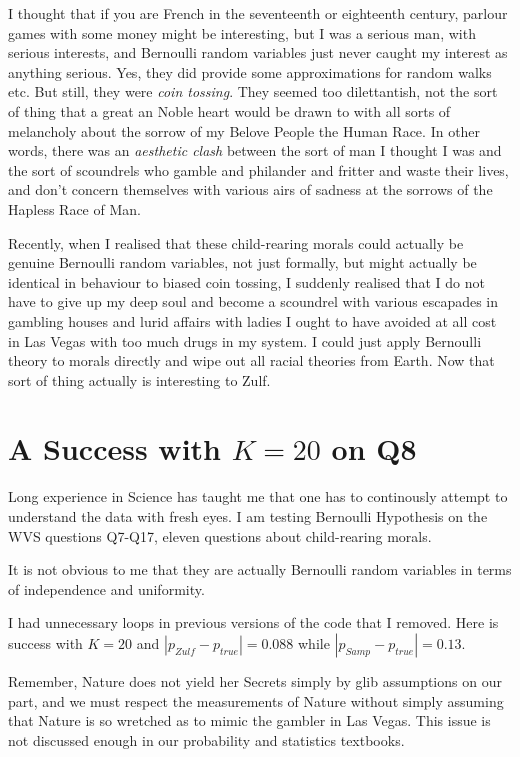 \documentclass{amsart}
\begin{document}
I thought that if you are French in the seventeenth or eighteenth century, parlour games with some money might be interesting, but I was a serious man, with serious interests, and Bernoulli random variables just never caught my interest as anything serious.  Yes, they did provide some approximations for random walks etc. But still, they were {\em coin tossing}.  They seemed too dilettantish, not the sort of thing that a great an Noble heart would be drawn to with all sorts of melancholy about the sorrow of my Belove People the Human Race.  In other words, there was an {\em aesthetic clash} between the sort of man I thought I was and the sort of scoundrels who gamble and philander and fritter and waste their lives, and don't concern themselves with various airs of sadness at the sorrows of the Hapless Race of Man.  

Recently, when I realised that these child-rearing morals could actually be genuine Bernoulli random variables, not just formally, but might actually be identical in behaviour to biased coin tossing, I suddenly realised that I do not have to give up my deep soul and become a scoundrel with various escapades in gambling houses and lurid affairs with ladies I ought to have avoided at all cost in Las Vegas with too much drugs in my system.  I could just apply Bernoulli theory to morals directly and wipe out all racial theories from Earth.  Now that sort of thing actually is interesting to Zulf. 

\section{A Success with $K=20$ on Q8}

Long experience in Science has taught me that one has to continously attempt to understand the data with fresh eyes.  I am testing Bernoulli Hypothesis on the WVS questions Q7-Q17, eleven questions about child-rearing morals. 

It is not obvious to me that they are actually Bernoulli random variables in terms of independence and uniformity.  

I had unnecessary loops in previous versions of the code that I removed.  Here is success with $K=20$ and $| p_{Zulf} - p_{true} | = 0.088$ while $| p_{Samp} - p_{true} | = 0.13$.

Remember, Nature does not yield her Secrets simply by glib assumptions on our part, and we must respect the measurements of Nature without simply assuming that Nature is so wretched as to mimic the gambler in Las Vegas.  This issue is not discussed enough in our probability and statistics textbooks.
\end{document}
